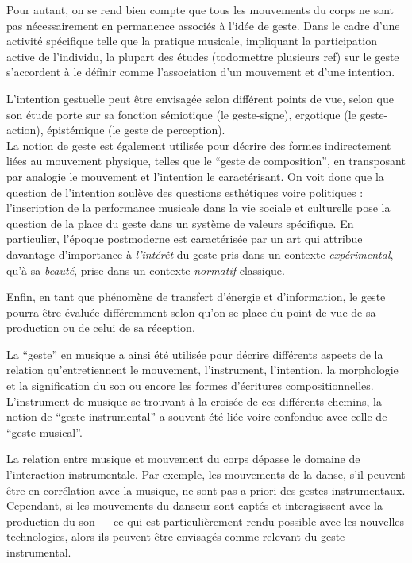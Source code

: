 Pour autant, on se rend bien compte que tous les mouvements du corps ne sont pas nécessairement en permanence associés à l'idée de geste. Dans le cadre d'une activité spécifique telle que la pratique musicale, impliquant la participation active de l'individu, la plupart des études (todo:mettre plusieurs ref) sur le geste s'accordent à le définir comme l'association d'un mouvement et d'une intention.

 \cite{imberty_mouvement_2013}

\noindent L'intention gestuelle peut être envisagée selon différent points de vue, selon que son étude porte sur sa fonction sémiotique (le geste-signe), ergotique (le geste-action), épistémique (le geste de perception).\\
\indent La notion de geste est également utilisée pour décrire des formes indirectement liées au mouvement physique, telles que le ``geste de composition'', en transposant par analogie le mouvement et l'intention le caractérisant. On voit donc que la question de l'intention soulève des questions esthétiques voire politiques : l'inscription de la performance musicale dans la vie sociale et culturelle pose la question de la place du geste dans un système de valeurs spécifique. En particulier, l'époque postmoderne est caractérisée par un art qui attribue davantage d'importance à \textit{l'intérêt} du geste pris dans un contexte \textit{expérimental}, qu'à sa \textit{beauté}, prise dans un contexte \textit{normatif} classique.

\indent Enfin, en tant que phénomène de transfert d'énergie et d'information, le geste pourra être évaluée différemment selon qu'on se place du point de vue de sa production ou de celui de sa réception. 

La ``geste'' en musique a ainsi été utilisée pour décrire différents aspects de la relation qu'entretiennent le mouvement, l'instrument, l'intention, la morphologie et la signification du son ou encore les formes d'écritures compositionnelles. L'instrument de musique se trouvant à la croisée de ces différents chemins, la notion de ``geste instrumental'' a souvent été liée voire confondue avec celle de ``geste musical''. 

La relation entre musique et mouvement du corps dépasse le domaine de l'interaction instrumentale. Par exemple, les mouvements de la danse, s'il peuvent être en corrélation avec la musique, ne sont pas a priori des gestes instrumentaux. Cependant, si les mouvements du danseur sont captés et interagissent avec la production du son — ce qui est particulièrement rendu possible avec les nouvelles technologies, alors ils peuvent être envisagés comme relevant du geste instrumental.

